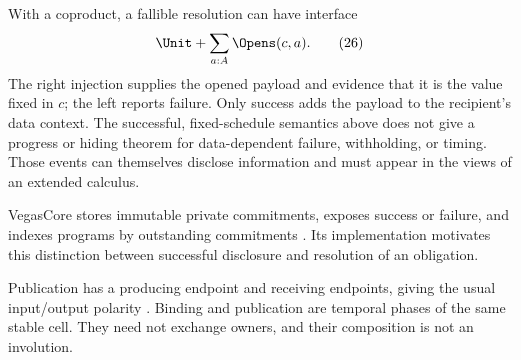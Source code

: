 With a coproduct, a fallible resolution can have interface
\[
 \Unit+\sum_{a:A}\Opens(c,a).
 \tag{26}
\]
The right injection supplies the opened payload and evidence that it is the
value fixed in $c$; the left reports failure. Only success adds the payload
to the recipient's data context. The successful, fixed-schedule semantics
above does not give a progress or hiding theorem for data-dependent failure,
withholding, or timing. Those events can themselves disclose information and
must appear in the views of an extended calculus.

VegasCore stores immutable private commitments, exposes success or failure,
and indexes programs by outstanding commitments
\cite{VegasCore2026}. Its implementation motivates this distinction between
successful disclosure and resolution of an obligation.

Publication has a producing endpoint and receiving endpoints, giving the
usual input/output polarity \cite{Griffith2016}. Binding and publication
are temporal phases of the same stable cell. They need not exchange owners,
and their composition is not an involution.
